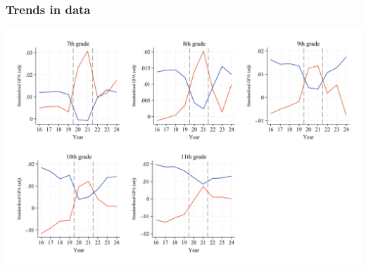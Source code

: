 \documentclass{beamer}
\begin{document}
\begin{frame}
    \label{frame:gpa_trends_grades_sec}
    \frametitle{Trends in data}
               \includegraphics[width=\textwidth]{./FIGURES/Descriptive/raw_grades_sec_std_gpa_m_adj_Tsiblings_Sall_Size2_4.pdf}    
          \hyperlink{frame:gpa_trends}{}
  
\end{frame}
\end{document}
